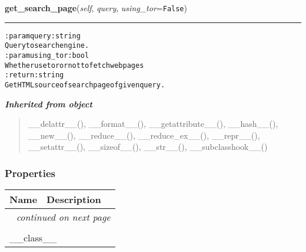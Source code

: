     \vspace{0.5ex}

\hspace{.8\funcindent}\begin{boxedminipage}{\funcwidth}

    \raggedright \textbf{get\_search\_page}(\textit{self}, \textit{query}, \textit{using\_tor}={\tt False})

    \vspace{-1.5ex}

    \rule{\textwidth}{0.5\fboxrule}
\setlength{\parskip}{2ex}
\begin{alltt}

:param query: string
    Query to search engine.
:param using\_tor: bool
    Whether use tor or not to fetch web pages
:return: string
    Get HTML source of search page of given query.
\end{alltt}

\setlength{\parskip}{1ex}
    \end{boxedminipage}


\large{\textbf{\textit{Inherited from object}}}

\begin{quote}
\_\_delattr\_\_(), \_\_format\_\_(), \_\_getattribute\_\_(), \_\_hash\_\_(), \_\_new\_\_(), \_\_reduce\_\_(), \_\_reduce\_ex\_\_(), \_\_repr\_\_(), \_\_setattr\_\_(), \_\_sizeof\_\_(), \_\_str\_\_(), \_\_subclasshook\_\_()
\end{quote}


  \subsubsection{Properties}

    \vspace{-1cm}
\hspace{\varindent}\begin{longtable}{|p{\varnamewidth}|p{\vardescrwidth}|l}
\cline{1-2}
\cline{1-2} \centering \textbf{Name} & \centering \textbf{Description}& \\
\cline{1-2}
\endhead\cline{1-2}\multicolumn{3}{r}{\small\textit{continued on next page}}\\\endfoot\cline{1-2}
\endlastfoot\multicolumn{2}{|l|}{\textit{Inherited from object}}\\
\multicolumn{2}{|p{\varwidth}|}{\raggedright \_\_class\_\_}\\
\cline{1-2}
\end{longtable}

